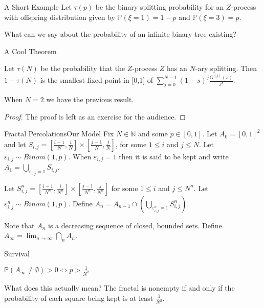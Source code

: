 \documentclass{beamer}
\begin{document}
\begin{frame}{A Short Example}
Let $\tau(p)$ be the binary splitting probability for an $Z$-process with offspring distribution given by $\mathbb{P}(\xi = 1) = 1 - p$ and $\mathbb{P}(\xi = 3) = p$.

\vspace{10 mm}
What can we say about the probability of an infinite binary tree existing?
\end{frame}

\begin{frame}{A Cool Theorem}
\begin{theorem}
Let $\tau(N)$ be the probability that the $Z$-process $Z$ has an $N$-ary splitting. Then $1 - \tau(N)$ is the smallest fixed point in [0,1] of $\sum_{j=0}^{N-1} (1-s)^j \frac{G^{(j)}(s)}{j!}$.
\end{theorem}

\pause
\vspace{10 mm}
When $N = 2$ we have the previous result.

\vspace{10 mm}
\pause
\begin{proof}
The proof is left as an exercise for the audience.
\end{proof}
\end{frame}

\begin{frame}{Fractal Percolations}{Our Model}
Fix $N \in \mathbb{N}$ and some $p \in [0,1]$. Let $A_0 = [0,1]^2$ and let $S_{i,j} = [\frac{i-1}{N}, \frac{i}{N}] \times [\frac{j-1}{N}, \frac{j}{N}]$, for some $1 \le i$ and $j \le N$. Let $\varepsilon_{i,j} \sim Binom(1,p)$. When $\varepsilon_{i,j} = 1$ then it is said to be kept and write $A_1 = \bigcup_{\varepsilon_{i,j} = 1} S_{i,j}$.

\pause
\vspace{10 mm}
Let $S_{i,j}^n = [\frac{i-1}{N^n}, \frac{i}{N^n}] \times [\frac{j-1}{N^n}, \frac{j}{N^n}]$ for some $1 \le i$ and $j \le N^n$. Let $\varepsilon_{i,j}^n \sim Binom(1,p)$. Define $A_n = A_{n-1} \cap (\bigcup_{\varepsilon_{i,j}^n = 1} S_{i,j}^n)$.

\pause
\vspace{10 mm}
Note that $A_n$ is a decreasing sequence of closed, bounded sets. Define  $A_{\infty} = \lim_{n \to \infty} \bigcap_n A_n$.
\end{frame}

\begin{frame}{Survival}
\begin{theorem}
$\mathbb{P}(A_{\infty} \ne \emptyset) > 0 \iff p > \frac{1}{N^2}$
\end{theorem}

\pause
\vspace{10 mm}
What does this actually mean? \pause The fractal is nonempty if and only if the probability of each square being kept is at least $\frac{1}{N^2}$.
\end{frame}
\end{document}
